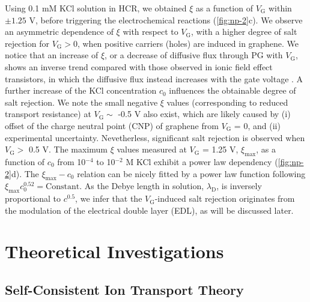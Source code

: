 Using 0.1 mM KCl solution in HCR, we obtained $\xi$ as a function of
$V_{\mathrm{G}}$ within $\pm1.25$ V, before triggering the
electrochemical reactions (\autoref{fig:np-2}c). We observe an
asymmetric dependence of $\xi$ with respect to $V_{\mathrm{G}}$, with
a higher degree of salt rejection for $V_{\mathrm{G}}>0$, when
positive carriers (holes) are induced in graphene.
%
We notice that an
increase of $\xi$, or a decrease of diffusive flux through PG with
$V_{\mathrm{G}}$, shows an inverse trend compared with those
observed in ionic field effect transistors, in which the
diffusive flux instead increases with the gate voltage
\cite{Nam_2009_IFET_sub10nm,Cheng_2018_gate_gox}. A further increase of the KCl
concentration $c_{0}$ influences the obtainable degree of salt
rejection.
%
We note the small negative $\xi$ values (corresponding to reduced transport resistance) at $V_{\mathrm{G}} \sim{}$ -0.5 V also exist, which are
likely caused by (i) offset of the charge neutral point (CNP) of graphene from $V_{\mathrm{G}}$ = 0, and (ii) experimental uncertainty.
Nevetherless, significant salt rejection is observed when $V_{\mathrm{G}}>$ 0.5 V.
%
The maximum $\xi$ values measured at $V_{\mathrm{G}}$ = 1.25 V,
$\xi_{\mathrm{max}}$, as a function of $c_{0}$ from 10$^{-4}$ to
10$^{-2}$ M KCl  exhibit
a power law dependency (\autoref{fig:np-2}d).
The
$\xi_{\mathrm{max}}-c_{0}$ relation can be nicely fitted by a power
law function following
$\xi_{\mathrm{max}} c_{0}^{0.52} = \mathrm{Constant}$. As the Debye
length in solution, $\lambda_{\mathrm{D}}$, is inversely proportional
to $c^{0.5}$, we infer that the $V_{\mathrm{G}}$-induced salt
rejection originates from the modulation of the electrical double
layer (EDL), as will be discussed later.

\section{Theoretical Investigations}
\label{sec:np-theor-invest}


\subsection{Self-Consistent Ion Transport Theory}
\label{sec:np-theory}

